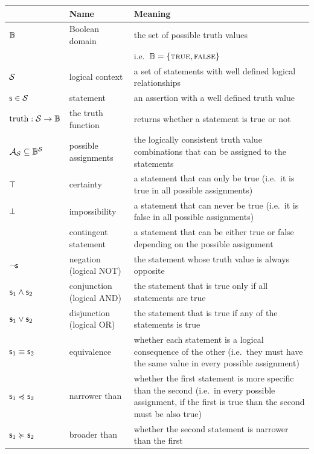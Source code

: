 \documentclass[11pt,letterpaper,fleqn]{memoir} %
\begin{document}
\begin{tabular}{p{} p{} p{}}
	& Name & Meaning  \\ 
	\hline 
	$\mathbb{B}$  & Boolean domain & the set of possible truth values \\ 
	&  & i.e.~$\mathbb{B} = \{\textsc{true}, \textsc{false}\}$ \\ 
	\hline 
	$\mathcal{S}$ & logical context & a set of statements with well defined logical relationships \\ 
	\hline 
	$\mathsf{s} \in \mathcal{S}$ & statement & an assertion with a well defined truth value \\ 
	\hline 
	$\operatorname{truth} : \mathcal{S} \to \mathbb{B}$ & the truth function & returns whether a statement is true or not  \\ 
	\hline 
	$\mathcal{A}_{\mathcal{S}} \subseteq \mathbb{B}^{\mathcal{S}}$& possible assignments & the logically consistent truth value combinations that can be assigned to the statements \\ 
	\hline 
	$\top$ & certainty & a statement that can only be true (i.e.~it is true in all possible assignments) \\ 
	\hline 
	$\bot$ & impossibility & a statement that can never be true (i.e.~it is false in all possible assignments) \\ 
	\hline 
	& contingent statement & a statement that can be either true or false depending on the possible assignment \\ 
	\hline 
	$\neg \mathsf{s}$ & negation (logical NOT) & the statement whose truth value is always opposite \\ 
	\hline 
	$\mathsf{s}_1 \wedge \mathsf{s}_2$ & conjunction (logical AND) & the statement that is true only if all statements are true \\ 
	\hline 
	$\mathsf{s}_1 \vee \mathsf{s}_2$ & disjunction (logical OR) & the statement that is true if any of the statements is true \\ 
	\hline 
	$\mathsf{s}_1 \equiv \mathsf{s}_2$ & equivalence & whether each statement is a logical consequence of the other (i.e.~they must have the same value in every possible assignment) \\ 
	\hline 
	$\mathsf{s}_1 \preccurlyeq \mathsf{s}_2$ & narrower than & whether the first statement is more specific than the second (i.e.~in every possible assignment, if the first is true than the second must be also true) \\ 
	\hline 
	$\mathsf{s}_1 \succcurlyeq \mathsf{s}_2$ & broader than & whether the second statement is narrower than the first \\ 
	\hline 

\end{tabular}
\end{document}
